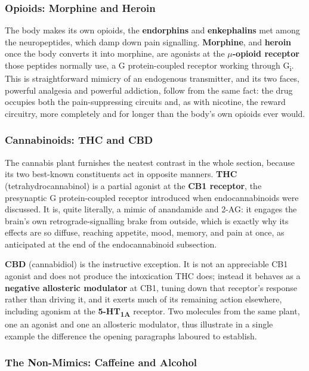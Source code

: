 \documentclass[11pt]{article}
\begin{document}
\subsubsection{Opioids: Morphine and Heroin}

The body makes its own opioids, the \textbf{endorphins} and \textbf{enkephalins} met among the neuropeptides, which damp down pain signalling. \textbf{Morphine}, and \textbf{heroin} once the body converts it into morphine, are agonists at the \textbf{$\mu$-opioid receptor} those peptides normally use, a G protein-coupled receptor working through G\textsubscript{i}. This is straightforward mimicry of an endogenous transmitter, and its two faces, powerful analgesia and powerful addiction, follow from the same fact: the drug occupies both the pain-suppressing circuits and, as with nicotine, the reward circuitry, more completely and for longer than the body's own opioids ever would.

\subsubsection{Cannabinoids: THC and CBD}

The cannabis plant furnishes the neatest contrast in the whole section, because its two best-known constituents act in opposite manners. \textbf{THC} (tetrahydrocannabinol) is a partial agonist at the \textbf{CB1 receptor}, the presynaptic G protein-coupled receptor introduced when endocannabinoids were discussed. It is, quite literally, a mimic of anandamide and 2-AG: it engages the brain's own retrograde-signalling brake from outside, which is exactly why its effects are so diffuse, reaching appetite, mood, memory, and pain at once, as anticipated at the end of the endocannabinoid subsection.

\textbf{CBD} (cannabidiol) is the instructive exception. It is not an appreciable CB1 agonist and does not produce the intoxication THC does; instead it behaves as a \textbf{negative allosteric modulator} at CB1, tuning down that receptor's response rather than driving it, and it exerts much of its remaining action elsewhere, including agonism at the \textbf{5-HT\textsubscript{1A}} receptor. Two molecules from the same plant, one an agonist and one an allosteric modulator, thus illustrate in a single example the difference the opening paragraphs laboured to establish.

\subsubsection{The Non-Mimics: Caffeine and Alcohol}
\end{document}
